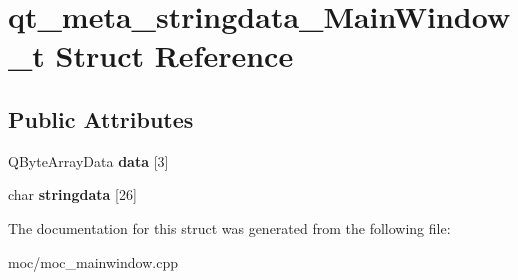 \hypertarget{structqt__meta__stringdata___main_window__t}{\section{qt\-\_\-meta\-\_\-stringdata\-\_\-\-Main\-Window\-\_\-t Struct Reference}
\label{structqt__meta__stringdata___main_window__t}
}
\subsection*{Public Attributes}
\begin{DoxyCompactItemize}
\item 
\hypertarget{structqt__meta__stringdata___main_window__t_a0a55531510dd06148b7b0f445e2b6c59}{Q\-Byte\-Array\-Data {\bfseries data} \mbox{[}3\mbox{]}}\label{structqt__meta__stringdata___main_window__t_a0a55531510dd06148b7b0f445e2b6c59}

\item 
\hypertarget{structqt__meta__stringdata___main_window__t_a3d76efa0e7bbfe9e02dc76fa032cd0e5}{char {\bfseries stringdata} \mbox{[}26\mbox{]}}\label{structqt__meta__stringdata___main_window__t_a3d76efa0e7bbfe9e02dc76fa032cd0e5}

\end{DoxyCompactItemize}


The documentation for this struct was generated from the following file\-:\begin{DoxyCompactItemize}
\item 
moc/moc\-\_\-mainwindow.\-cpp\end{DoxyCompactItemize}
